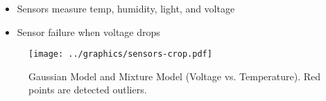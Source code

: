 
\begin{block}{}
\vspace{-1cm}
\begin{itemize}
\item Sensors measure temp, humidity, light, and voltage
\item Sensor failure when voltage drops
\end{itemize}
        \begin{figure}
          \centering
          \texttt{[image: ../graphics/sensors-crop.pdf]}
          \caption{Gaussian Model and Mixture Model (Voltage vs. Temperature). Red points are detected outliers.}
        \end{figure}

\vspace{-1.5cm}
\end{block}
